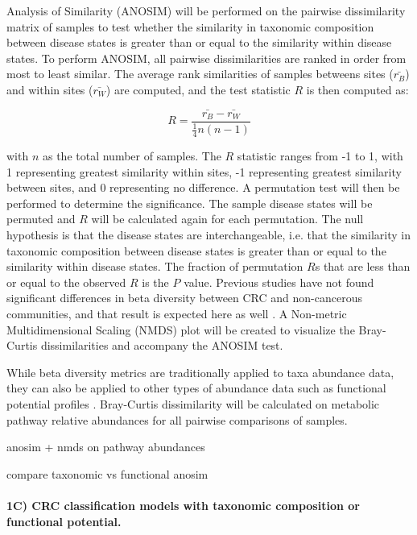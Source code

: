 \documentclass[11pt]{article}
\begin{document}
Analysis of Similarity (ANOSIM) will be performed on the pairwise dissimilarity matrix of samples to test whether the similarity in taxonomic composition between disease states is greater than or equal to the similarity within disease states. \cite{clarke_non-parametric_1993}
To perform ANOSIM, all pairwise dissimilarities are ranked in order from most to least similar.
The average rank similarities of samples betweens sites ($\bar{r_B}$) and within sites ($\bar{r_W}$) are computed, and the test statistic $R$ is then computed as:

$$R = \frac{ \bar{r_B} - \bar{r_W} }{ \frac{1}{4} n(n-1) }$$

with $n$ as the total number of samples.
The $R$ statistic ranges from -1 to 1, with 1 representing greatest similarity within sites, -1 representing greatest similarity between sites, and 0 representing no difference.
A permutation test will then be performed to determine the significance.
The sample disease states will be permuted and $R$ will be calculated again for each permutation.
The null hypothesis is that the disease states are interchangeable, i.e. that the similarity in taxonomic composition between disease states is greater than or equal to the similarity within disease states.
The fraction of permutation $R$s that are less than or equal to the observed $R$ is the $P$ value.
Previous studies have not found significant differences in beta diversity between CRC and non-cancerous communities, and that result is expected here as well \cite{weir_stool_2013, hannigan_diagnostic_2018, topcuoglu_framework_2020}.
A Non-metric Multidimensional Scaling (NMDS) plot will be created to visualize the Bray-Curtis dissimilarities and accompany the ANOSIM test.

While beta diversity metrics are traditionally applied to taxa abundance data,
they can also be applied to other types of abundance data such as functional potential profiles \cite{franzosa_species-level_2018}.
Bray-Curtis dissimilarity will be calculated on metabolic pathway relative abundances for all pairwise comparisons of samples.

anosim + nmds on pathway abundances

compare taxonomic vs functional anosim


\paragraph{1C) CRC classification models with taxonomic composition or functional potential.}
\end{document}
